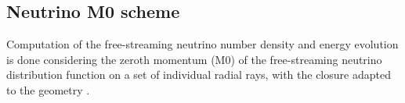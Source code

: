 





\subsection{Neutrino M0 scheme}


Computation of the free-streaming neutrino number density and energy evolution is 
done considering the zeroth momentum (M0) of the free-streaming neutrino distribution 
function on a set of individual radial rays, with the closure adapted 
to the \pmerg{} geometry \citep{Radice:2016dwd,Radice:2018pdn}.

